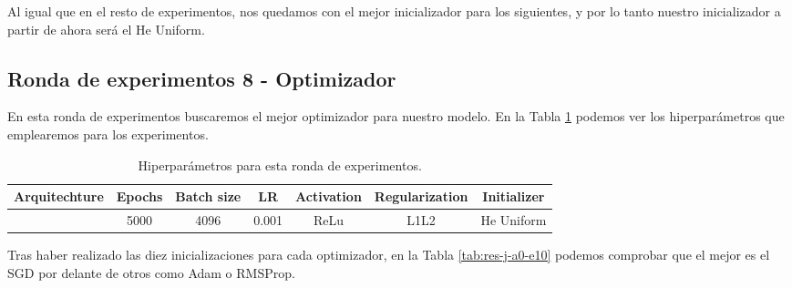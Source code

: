 \documentclass{article}
\begin{document}
Al igual que en el resto de experimentos, nos quedamos con el mejor inicializador para los siguientes, y por lo tanto nuestro inicializador a partir de ahora será el He Uniform.

\subsection{Ronda de experimentos 8 - Optimizador}
En esta ronda de experimentos buscaremos el mejor optimizador para nuestro modelo. En la Tabla \ref{tab:hip-j-a0-e10} podemos ver los hiperparámetros que emplearemos para los experimentos.

\begin{table}[h!]
    \begin{center}
    \begin{tabular}{| c | c | c | c | c | c | c |}
            \textbf{Arquitechture} & \textbf{Epochs} & \textbf{Batch size} & \textbf{LR} & \textbf{Activation} &\textbf{Regularization} & \textbf{Initializer}\\ \hline
            [32,16,8] & 5000 & 4096 & 0.001 & ReLu & L1L2 & He Uniform \\ \hline
        \end{tabular}
        \caption{Hiperpar\'ametros para esta ronda de experimentos.}
        \label{tab:hip-j-a0-e10}
    \end{center}
\end{table}

Tras haber realizado las diez inicializaciones para cada optimizador, en la Tabla \ref{tab:res-j-a0-e10} podemos comprobar que el mejor es el SGD por delante de otros como Adam o RMSProp.
\end{document}

